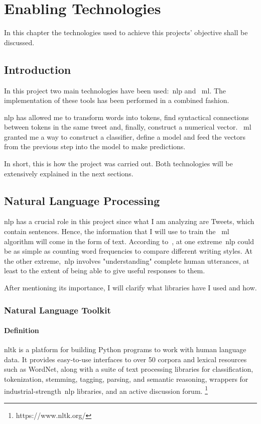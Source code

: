 \chapter{Enabling Technologies}
\label{chap:architecture}

\label{sec:introduction}
In this chapter the technologies used to achieve this projects' objective shall be discussed.

\section{Introduction}\par
{}
In this project two main technologies have been used:~\ac{nlp}  and ~\ac{ml}. The implementation of these tools has been performed in a combined fashion. \par
\ac{nlp} has allowed me to transform words into tokens, find syntactical connections between tokens in the same tweet and, finally, construct a numerical vector. ~\ac{ml} granted me a way to construct a classifier, define a model and feed the vectors from the previous step into the model to make predictions.\par
In short, this is how the project was carried out. Both technologies will be extensively explained in the next sections.

\section{Natural Language Processing}
\ac{nlp} has a crucial role in this project since what I am analyzing are Tweets, which contain sentences. Hence, the information that I will use to train the ~\ac{ml} algorithm will come in the form of text. According to~\cite{bird2009natural}, at one extreme~\ac{nlp} could be as simple as counting word frequencies to compare different writing styles. At the other extreme,~\ac{nlp} involves "understanding" complete human utterances, at least to the extent of being able to give useful responses to them.\par
After mentioning its importance, I will clarify what libraries have I used and how.
\label{sec:NLP}
\subsection{Natural Language Toolkit}
\subsubsection{Definition}
\ac{nltk} is a platform for building Python programs to work with human language data. It provides easy-to-use interfaces to over 50 corpora and lexical resources such as WordNet, along with a suite of text processing libraries for classification, tokenization, stemming, tagging, parsing, and semantic reasoning, wrappers for industrial-strength~\ac{nlp} libraries, and an active discussion forum. \footnote{https://www.nltk.org/}
